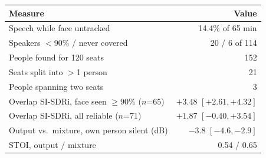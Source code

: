 \begin{tabular}{@{}lr@{}}
\toprule
Measure & Value \\
\midrule
Speech while face untracked & 14.4\% of 65 min \\
Speakers $<$90\% / never covered & 20 / 6 of 114 \\
People found for 120 seats & 152 \\
Seats split into $>$1 person & 21 \\
People spanning two seats & 3 \\
Overlap SI-SDRi, face seen $\ge$90\% ($n$=65) & $+3.48$ {\scriptsize$[+2.61, +4.32]$} \\
Overlap SI-SDRi, all reliable ($n$=71) & $+1.87$ {\scriptsize$[-0.40, +3.54]$} \\
Output vs.\ mixture, own person silent (dB) & $-3.8$ {\scriptsize$[-4.6, -2.9]$} \\
STOI, output / mixture & 0.54 / 0.65 \\
\bottomrule
\end{tabular}
